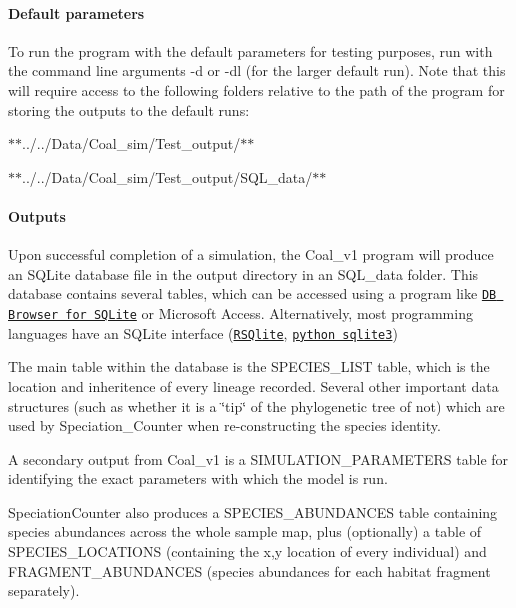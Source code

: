 \paragraph*{Default parameters}

To run the program with the default parameters for testing purposes, run with the command line arguments -\/d or -\/dl (for the larger default run). Note that this will require access to the following folders relative to the path of the program for storing the outputs to the default runs\+:

$\ast$$\ast$../../\+Data/\+Coal\+\_\+sim/\+Test\+\_\+output/$\ast$$\ast$

$\ast$$\ast$../../\+Data/\+Coal\+\_\+sim/\+Test\+\_\+output/\+S\+Q\+L\+\_\+data/$\ast$$\ast$

\paragraph*{Outputs}

Upon successful completion of a simulation, the Coal\+\_\+v1 program will produce an S\+Q\+Lite database file in the output directory in an S\+Q\+L\+\_\+data folder. This database contains several tables, which can be accessed using a program like \href{http://sqlitebrowser.org/}{\tt DB Browser for S\+Q\+Lite} or Microsoft Access. Alternatively, most programming languages have an S\+Q\+Lite interface (\href{https://cran.r-project.org/web/packages/RSQLite/index.html}{\tt R\+S\+Qlite}, \href{https://docs.python.org/2/library/sqlite3.html}{\tt python sqlite3})


\begin{DoxyItemize}
\item The main table within the database is the S\+P\+E\+C\+I\+E\+S\+\_\+\+L\+I\+ST table, which is the location and inheritence of every lineage recorded. Several other important data structures (such as whether it is a \char`\"{}tip\char`\"{} of the phylogenetic tree of not) which are used by Speciation\+\_\+\+Counter when re-\/constructing the species identity.
\item A secondary output from Coal\+\_\+v1 is a S\+I\+M\+U\+L\+A\+T\+I\+O\+N\+\_\+\+P\+A\+R\+A\+M\+E\+T\+E\+RS table for identifying the exact parameters with which the model is run.
\item Speciation\+Counter also produces a S\+P\+E\+C\+I\+E\+S\+\_\+\+A\+B\+U\+N\+D\+A\+N\+C\+ES table containing species abundances across the whole sample map, plus (optionally) a table of S\+P\+E\+C\+I\+E\+S\+\_\+\+L\+O\+C\+A\+T\+I\+O\+NS (containing the x,y location of every individual) and F\+R\+A\+G\+M\+E\+N\+T\+\_\+\+A\+B\+U\+N\+D\+A\+N\+C\+ES (species abundances for each habitat fragment separately).
\end{DoxyItemize}

